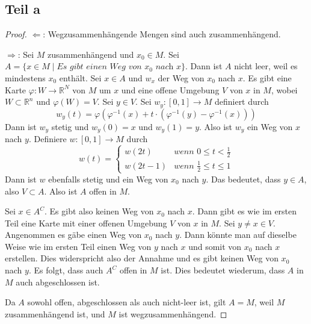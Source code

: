 \documentclass[10pt,a4paper]{article}
\begin{document}
\subsection{Teil a}
\begin{proof}
  $\Leftarrow$: Wegzusammenhängende Mengen sind auch zusammenhängend.

  $\Rightarrow$: Sei $M$ zusammenhängend und $x_{0} \in M$.
  Sei $A = \{ x \in M \mid \textit{Es gibt einen Weg von $x_0$ nach $x$} \}$.
  Dann ist $A$ nicht leer, weil es mindestens $x_{0}$ enthält.
  Sei $x \in A$ und $w_{x}$ der Weg von $x_{0}$ nach $x$.
  Es gibt eine Karte $\varphi : W \rightarrow \mathbb{R}^{N}$ von $M$ um $x$ und eine offene Umgebung $V$ von $x$ in $M$, wobei $W \subset \mathbb{R}^{n}$ und $\varphi(W) = V$.
  Sei $y \in V$.
  Sei $w_{y} : [0, 1] \rightarrow M$ definiert durch
  \begin{equation}
    w_{y}(t) = \varphi(\varphi^{-1}(x) + t \cdot (\varphi^{-1}(y) - \varphi^{-1}(x)))
  \end{equation}
  Dann ist $w_{y}$ stetig und $w_{y}(0) = x$ und $w_{y}(1) = y$.
  Also ist $w_{y}$ ein Weg von $x$ nach $y$.
  Definiere $w : [0, 1] \rightarrow M$ durch
  \begin{equation}
    w(t) = \begin{cases}
      w(2t) & \textit{wenn $0 \le t < \frac{1}{2}$}\\
      w(2t - 1) & \textit{wenn $\frac{1}{2} \le t \le 1$}
    \end{cases}
  \end{equation}
  Dann ist $w$ ebenfalls stetig und ein Weg von $x_{0}$ nach $y$.
  Das bedeutet, dass $y \in A$, also $V \subset A$.
  Also ist $A$ offen in $M$.

  Sei $x \in A^{C}$.
  Es gibt also keinen Weg von $x_{0}$ nach $x$.
  Dann gibt es wie im ersten Teil eine Karte mit einer offenen Umgebung $V$ von $x$ in $M$.
  Sei $y \ne x \in V$.
  Angenommen es gäbe einen Weg von $x_{0}$ nach $y$.
  Dann könnte man auf dieselbe Weise wie im ersten Teil einen Weg von $y$ nach $x$ und somit von $x_{0}$ nach $x$ erstellen.
  Dies widerspricht also der Annahme und es gibt keinen Weg von $x_{0}$ nach $y$.
  Es folgt, dass auch $A^{C}$ offen in $M$ ist.
  Dies bedeutet wiederum, dass $A$ in $M$ auch abgeschlossen ist.

  Da $A$ sowohl offen, abgeschlossen als auch nicht-leer ist, gilt $A = M$, weil $M$ zusammenhängend ist, und $M$ ist wegzusammenhängend.
\end{proof}
\end{document}
